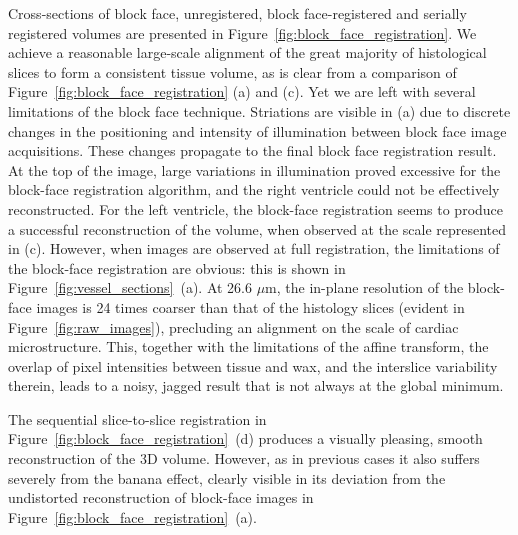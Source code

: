   Cross-sections of block face, unregistered, block face-registered and serially registered volumes are presented in Figure~\ref{fig:block_face_registration}. We achieve a reasonable large-scale alignment of the great majority of histological slices to form a consistent tissue volume, as is clear from a comparison of Figure~\ref{fig:block_face_registration} (a) and (c). Yet we are left with several limitations of the block face technique. Striations are visible in (a) due to discrete changes in the positioning and intensity of illumination between block face image acquisitions. These changes propagate to the final block face registration result. At the top of the image, large variations in illumination proved excessive for the block-face registration algorithm, and the right ventricle could not be effectively reconstructed. For the left ventricle, the block-face registration seems to produce a successful reconstruction of the volume, when observed at the scale represented in (c). However, when images are observed at full registration, the limitations of the block-face registration are obvious: this is shown in Figure~\ref{fig:vessel_sections}~(a). At 26.6 $\mu$m, the in-plane resolution of the block-face images is 24 times coarser than that of the histology slices (evident in Figure~\ref{fig:raw_images}), precluding an alignment on the scale of cardiac microstructure. This, together with the limitations of the affine transform, the overlap of pixel intensities between tissue and wax, and the interslice variability therein, leads to a noisy, jagged result that is not always at the global minimum.
  
  The sequential slice-to-slice registration in Figure~\ref{fig:block_face_registration}~(d) produces a visually pleasing, smooth reconstruction of the 3D volume. However, as in previous cases it also suffers severely from the banana effect, clearly visible in its deviation from the undistorted reconstruction of block-face images in Figure~\ref{fig:block_face_registration}~(a).
  
